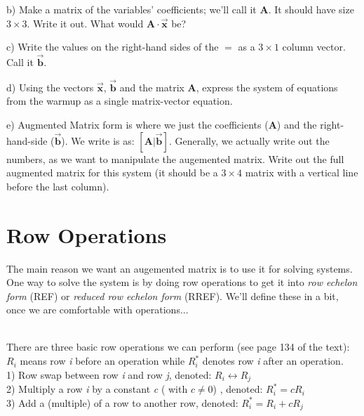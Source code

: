 \documentclass{article}
\begin{document}
\begin{flushleft}
\vspace{0.2in}

b) Make a matrix of the variables' coefficients; we'll call it \textbf{A}.  It should have size $3 \times 3$.  Write it out. What would $\textbf{A}\cdot\vec{\textbf{x}}$ be?

\vspace{1.5in}

c) Write the values on the right-hand sides of the $=$ as a $3 \times 1$ column vector.  Call it $\vec{\textbf{b}}$.

\vspace{1in}

d) Using the vectors $\vec{\textbf{x}}$, $\vec{\textbf{b}}$ and the matrix \textbf{A}, express the system of equations from the warmup as a single matrix-vector equation.

\vspace{1.5in}

e) Augmented Matrix form is where we just the coefficients (\textbf{A}) and the right-hand-side ($\vec{\textbf{b}}$). We write is as: $[\textbf{A}|\vec{\textbf{b}}]$. Generally, we actually write out the numbers, as we want to manipulate the augemented matrix.  Write out the full augmented matrix for this system (it should be a $3 \times 4$ matrix with a vertical line before the last column).

\newpage

\section{Row Operations}

The main reason we want an augemented matrix is to use it for solving systems. One way to solve the system is by doing row operations to get it into \textit{row echelon form} (REF) or \textit{reduced row echelon form} (RREF). We'll define these in a bit, once we are comfortable with operations...\\

\vspace{0.1in}

\hrulefill \\
\noindent
There are three basic row operations we can perform (see page 134 of the text):\\
$R_i$ means row \textit{i} before an operation while $R_i^*$ denotes row \textit{i} after an operation.\\
1) Row swap between row \textit{i} and row \textit{j}, denoted: $R_i \leftrightarrow R_j$\\
2) Multiply a row \textit{i} by a constant \textit{c} ( with $c\neq 0$) , denoted: $R_i^*=c R_i$\\
3) Add a (multiple) of a row to another row, denoted: $R_i^*= R_i+c R_j$\\
\hrulefill \\


\end{flushleft}
\end{document}
